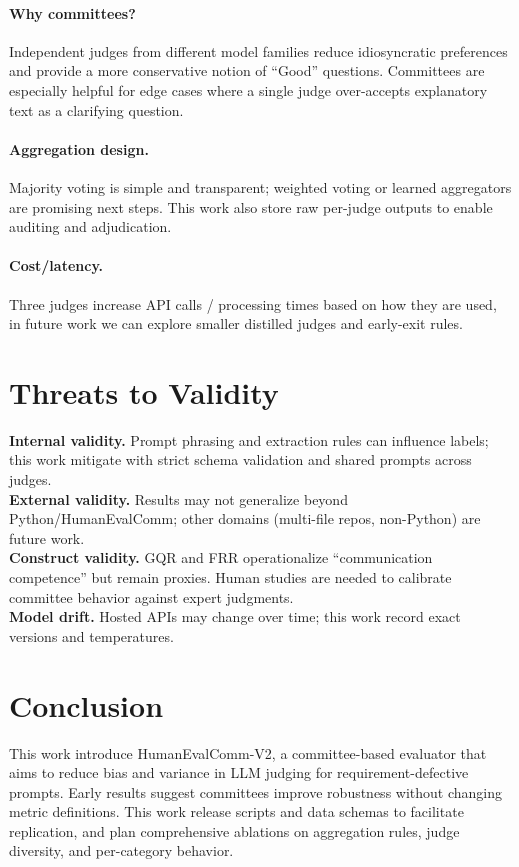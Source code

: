 \documentclass[acmsmall,screen,nonacm]{acmart}
\begin{document}
\paragraph{Why committees?} Independent judges from different model families reduce idiosyncratic preferences and provide a more conservative notion of ``Good'' questions. Committees are especially helpful for edge cases where a single judge over-accepts explanatory text as a clarifying question.

\paragraph{Aggregation design.} Majority voting is simple and transparent; weighted voting or learned aggregators are promising next steps. This work also store raw per-judge outputs to enable auditing and adjudication.

\paragraph{Cost/latency.} Three judges increase API calls / processing times based on how they are used, in future work we can explore smaller distilled judges and early-exit rules.

\section{Threats to Validity}
\textbf{Internal validity.} Prompt phrasing and extraction rules can influence labels; this work mitigate with strict schema validation and shared prompts across judges.\\
\textbf{External validity.} Results may not generalize beyond Python/HumanEvalComm; other domains (multi-file repos, non-Python) are future work.\\
\textbf{Construct validity.} GQR and FRR operationalize ``communication competence'' but remain proxies. Human studies are needed to calibrate committee behavior against expert judgments.\\
\textbf{Model drift.} Hosted APIs may change over time; this work record exact versions and temperatures.

\section{Conclusion}
This work introduce HumanEvalComm-V2, a committee-based evaluator that aims to reduce bias and variance in LLM judging for requirement-defective prompts. Early results suggest committees improve robustness without changing metric definitions. This work release scripts and data schemas to facilitate replication, and plan comprehensive ablations on aggregation rules, judge diversity, and per-category behavior.
\end{document}
